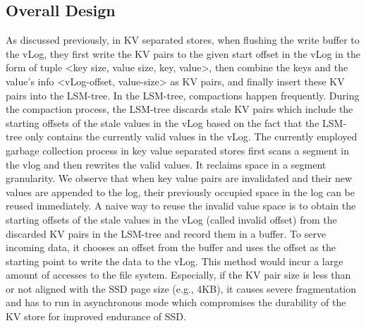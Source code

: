 \documentclass[sigconf]{acmart}
\begin{document}
\subsection{Overall Design} \label{bd}
As discussed previously, in KV separated stores, when flushing the write buffer to the vLog, they first write the KV pairs to the given start offset in the vLog in the form of tuple \textless key size, value size, key, value\textgreater, then combine the keys and the value's info \textless vLog-offset, value-size\textgreater{} as KV pairs, and finally insert these KV pairs into the LSM-tree. In the LSM-tree, compactions happen frequently. During the compaction process, the LSM-tree discards stale KV pairs which include the starting offsets of the stale values in the vLog based on the fact that the LSM-tree only contains the currently valid values in the vLog. The currently employed garbage collection process in key value separated stores first scans a segment in the vlog and then rewrites the valid values. It reclaims space in a segment granularity. We observe that when key value pairs are invalidated and their new values are appended to the log, their previously occupied space in the log can be reused immediately.  A naive way to reuse the invalid value space is to obtain the starting offsets of the stale values in the vLog (called invalid offset) from the discarded KV pairs in the LSM-tree and record them in a buffer. To serve incoming data, it chooses an offset from the buffer and uses the offset as the starting point to write the data to the vLog. This method would incur a large amount of accesses to the file system. Especially, if the KV pair size is less than or not aligned with the SSD page size (e.g., 4KB), it causes severe fragmentation and has to run in asynchronous mode which compromises the durability of the KV store for improved endurance of SSD.
\end{document}
